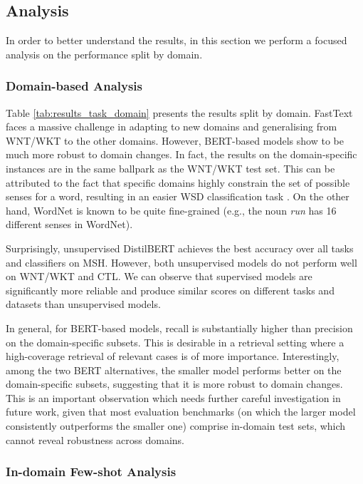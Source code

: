 \documentclass[11pt,a4paper]{article}
\begin{document}
\subsection{Analysis}

In order to better understand the results, in this section we perform a focused analysis on the performance split by domain.

\subsubsection{Domain-based Analysis}

Table \ref{tab:results_task_domain} presents the results split by domain. FastText faces a massive challenge in adapting to new domains and generalising from WNT/WKT to the other domains. However, BERT-based models show to be much more robust to domain changes. In fact, the results on the domain-specific instances are in the same ballpark as the {WNT/WKT} test set.  
This can be attributed to the fact that specific domains highly constrain the set of possible senses for a word, resulting in an easier WSD classification task \cite{magnini2002role}. 
On the other hand, WordNet is known to be quite fine-grained (e.g., the noun \textit{run} has 16 different senses in WordNet).

Surprisingly, unsupervised DistilBERT achieves the best accuracy over all tasks and classifiers on MSH. However, both unsupervised models do not perform well on WNT/WKT and CTL. We can observe that supervised models are significantly more reliable and produce similar scores on different tasks and datasets 
than unsupervised models.

In general, for BERT-based models, recall is substantially higher than precision on the domain-specific subsets. This is desirable in a retrieval setting where a high-coverage retrieval of relevant cases is of more importance.
Interestingly, among the two BERT alternatives, the smaller model performs better on the domain-specific subsets, suggesting that it is more robust to domain changes.
This is an important observation which needs further careful investigation in future work, given that most evaluation benchmarks (on which the larger model consistently outperforms the smaller one) comprise in-domain test sets, which cannot reveal robustness across domains.

\subsubsection{In-domain Few-shot Analysis} 
\end{document}
